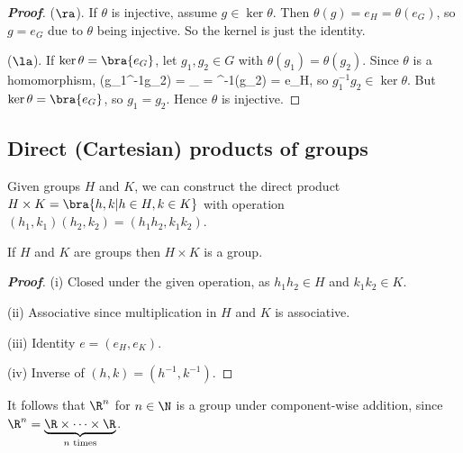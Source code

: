 \begin{proof}[\bf Proof]
($\ra$). If $\theta$ is injective, assume $g\in \ker\theta$. Then $\theta(g) = e_H = \theta(e_G)$, so $g=e_G$ due to $\theta$ being injective. So the kernel is just the identity.

($\la$). If $\ker \theta = \bra{e_G}$, let $g_1,g_2\in G$ with $\theta(g_1) = \theta(g_2)$. Since $\theta$ is a homomorphism,
\be
\theta(g_1^{-1}g_2) = _{} = ^{-1}\theta(g_2) = e_H,
\ee
so $g_1^{-1} g_2 \in \ker \theta$. But $\ker\theta = \bra{e_G}$, so $g_1 = g_2$. Hence $\theta$ is injective.
\end{proof}


\subsection{Direct (Cartesian) products of groups}

\begin{definition}\label{def:direct_product_group}
Given groups $H$ and $K$, we can construct the direct product $H\times K = \bra{h,k|h\in H,k\in K}$ with operation $(h_1,k_1)(h_2,k_2) = (h_1h_2,k_1k_2)$.
\end{definition}

\begin{lemma}\label{lem:direct_product_of_groups}
If $H$ and $K$ are groups then $H\times K$ is a group.
\end{lemma}

\begin{proof}[\bf Proof]
\ben
\item [(i)] Closed under the given operation, as $h_1h_2 \in H$ and $k_1k_2 \in K$.
\item [(ii)] Associative since multiplication in $H$ and $K$ is associative.
\item [(iii)] Identity $e = (e_H,e_K)$.
\item [(iv)] Inverse of $(h,k) = (h^{-1},k^{-1})$.
\een
\end{proof}



\begin{example}
It follows that $\R^n$ for $n\in \N$ is a group under component-wise addition, since $\R^n = \underbrace{\R\times\dots \times \R}_{n\text{ times}}$.
\end{example}

